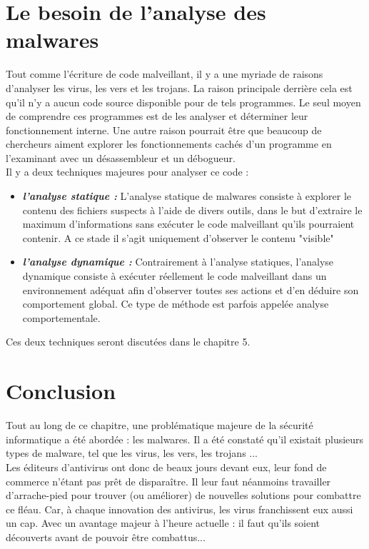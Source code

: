 \section{Le besoin de l'analyse des malwares}
Tout comme l'écriture de code malveillant, il y a une myriade de raisons d'analyser les virus, les vers et les trojans. La raison principale derrière cela est qu'il n'y a aucun code source disponible pour de tels programmes. Le seul
moyen de comprendre ces programmes est de les analyser et déterminer leur fonctionnement interne. Une autre raison pourrait être que beaucoup de chercheurs aiment explorer les fonctionnements cachés d'un programme en l'examinant avec un désassembleur et un débogueur.\\


Il y a deux techniques majeures pour analyser ce code :\\

\begin{itemize}
\item \textbf{\textit{l'analyse statique : }}L'analyse statique de malwares consiste à explorer le contenu des fichiers suspects à l'aide de divers outils, dans le but d'extraire le maximum d'informations sans exécuter le code malveillant qu'ils pourraient contenir. A ce stade il s'agit uniquement d'observer le contenu "visible"\\
\item \textbf{\textit{l'analyse dynamique : }}Contrairement à l'analyse statiques, l'analyse dynamique consiste à exécuter réellement le code malveillant dans un environnement adéquat afin d'observer toutes ses actions et d'en déduire son comportement global. Ce type de méthode est parfois appelée analyse comportementale.\\

\end{itemize}


Ces deux techniques seront discutées dans le chapitre 5.
\section{Conclusion}
Tout au long de ce chapitre, une problématique majeure de la sécurité informatique a été abordée : les malwares.
Il a été constaté qu'il existait plusieurs types de malware, tel que les virus, les vers, les trojans ...\\


Les éditeurs d'antivirus ont donc de beaux jours devant eux, leur fond de commerce n'étant pas prêt de disparaître. Il leur faut néanmoins travailler d'arrache-pied pour trouver (ou améliorer) de nouvelles solutions pour combattre ce
fléau. Car, à chaque innovation des antivirus, les virus franchissent eux aussi un cap. Avec un avantage majeur à l'heure actuelle : il faut qu'ils soient découverts avant de pouvoir être combattus...\\


